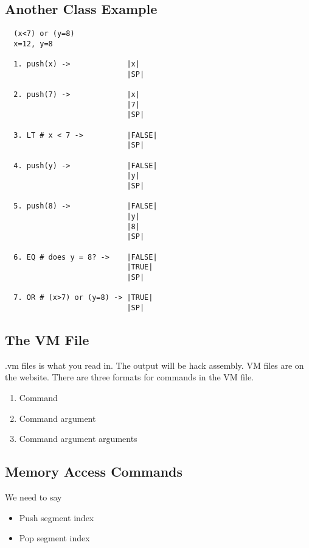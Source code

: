 \documentclass[12pt]{article}
\begin{document}
\subsection*{Another Class Example}
\begin{verbatim}
  (x<7) or (y=8)
  x=12, y=8

  1. push(x) ->             |x|
                            |SP|

  2. push(7) ->             |x|
                            |7|
                            |SP|

  3. LT # x < 7 ->          |FALSE|
                            |SP|

  4. push(y) ->             |FALSE|
                            |y|
                            |SP|

  5. push(8) ->             |FALSE|
                            |y|
                            |8|
                            |SP|

  6. EQ # does y = 8? ->    |FALSE|
                            |TRUE|
                            |SP|

  7. OR # (x>7) or (y=8) -> |TRUE|
                            |SP|
\end{verbatim}

\subsection*{The VM File}
.vm files is what you read in. The output will be hack assembly. VM files are on the website. There
are three formats for commands in the VM file. 
\begin{enumerate}[1.]
  \item
    Command
  \item
    Command argument

  \item
    Command argument arguments
  
\end{enumerate}

\subsection*{Memory Access Commands}
We need to say
\begin{itemize}
  \item
    Push segment index

  \item
    Pop segment index
\end{itemize}
\end{document}
